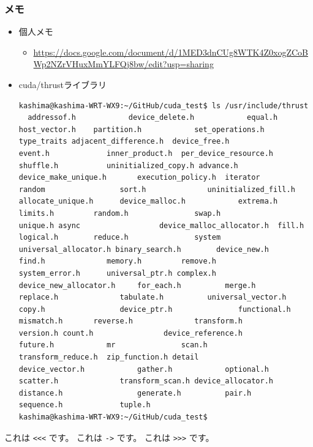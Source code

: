 \documentclass[12pt,a4paper,uplatex]{jsarticle}
\begin{document}
\subsubsection*{メモ}
\begin{itemize}
  \item 個人メモ
  \begin{itemize}
    \item \url{https://docs.google.com/document/d/1MED3dnCUg8WTK4Z0xogZCoBWp2NZrVHuxMmYLFQj8bw/edit?usp=sharing}
  \end{itemize}
  \item cuda/thrustライブラリ
  \begin{lstlisting}
kashima@kashima-WRT-WX9:~/GitHub/cuda_test$ ls /usr/include/thrust
  addressof.h            device_delete.h            equal.h             host_vector.h    partition.h            set_operations.h    type_traits adjacent_difference.h  device_free.h              event.h             inner_product.h  per_device_resource.h  shuffle.h           uninitialized_copy.h advance.h              device_make_unique.h       execution_policy.h  iterator         random                 sort.h              uninitialized_fill.h allocate_unique.h      device_malloc.h            extrema.h           limits.h         random.h               swap.h              unique.h async                  device_malloc_allocator.h  fill.h              logical.h        reduce.h               system              universal_allocator.h binary_search.h        device_new.h               find.h              memory.h         remove.h               system_error.h      universal_ptr.h complex.h              device_new_allocator.h     for_each.h          merge.h          replace.h              tabulate.h          universal_vector.h copy.h                 device_ptr.h               functional.h        mismatch.h       reverse.h              transform.h         version.h count.h                device_reference.h         future.h            mr               scan.h                 transform_reduce.h  zip_function.h detail                 device_vector.h            gather.h            optional.h       scatter.h              transform_scan.h device_allocator.h     distance.h                 generate.h          pair.h           sequence.h             tuple.h
kashima@kashima-WRT-WX9:~/GitHub/cuda_test$ 
  \end{lstlisting}
\end{itemize}

これは \lstinline|<<<| です。
これは \lstinline|->| です。
これは \lstinline|>>>| です。
\end{document}
